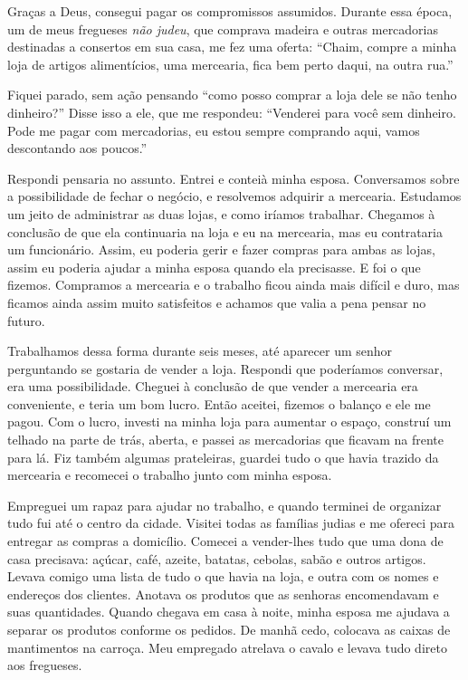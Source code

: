 Graças a Deus, consegui pagar os compromissos assumidos. Durante essa época, um 
de meus fregueses \textit{não judeu}, que comprava madeira e outras
mercadorias destinadas a consertos em sua casa, me fez uma oferta: ``Chaim,
compre a minha loja de artigos alimentícios, uma mercearia, fica bem
perto daqui, na outra rua.''

Fiquei parado, sem ação pensando ``como posso comprar a loja dele se
não tenho dinheiro?'' Disse isso a ele, que me respondeu: ``Venderei
para você sem dinheiro. Pode me pagar com mercadorias, eu estou
sempre comprando aqui, vamos descontando aos poucos.''

Respondi pensaria no assunto. Entrei e conteià minha esposa. Conversamos sobre a possibilidade de
fechar o negócio, e resolvemos adquirir a mercearia. Estudamos um
jeito de administrar as duas lojas, e como iríamos trabalhar. Chegamos à
conclusão de que ela continuaria na loja e eu na mercearia, mas
eu contrataria um funcionário. Assim, eu poderia gerir e fazer compras para ambas as lojas, 
assim eu poderia ajudar a minha esposa quando ela precisasse. E foi o que fizemos. Compramos a mercearia
e o trabalho ficou ainda mais difícil e duro, mas ficamos ainda assim 
muito satisfeitos e achamos que valia a pena pensar no futuro.

Trabalhamos dessa forma durante seis meses, até aparecer um senhor perguntando se 
gostaria de vender a loja. Respondi que poderíamos conversar, era uma possibilidade.
Cheguei à conclusão de que vender a mercearia era conveniente, e teria um bom lucro. 
Então aceitei, fizemos o balanço e ele me pagou. Com o lucro, investi
na minha loja para aumentar o espaço, construí um telhado na parte de trás, aberta, 
e passei as mercadorias que ficavam na frente para lá. Fiz também 
algumas prateleiras, guardei tudo o que havia trazido da mercearia e
recomecei o trabalho junto com minha esposa.

Empreguei um rapaz para ajudar no trabalho, e quando terminei de organizar tudo fui
até o centro da cidade. Visitei todas as famílias judias e me ofereci para entregar as compras a
domicílio. Comecei a vender-lhes tudo que uma dona de casa precisava:
açúcar, café, azeite, batatas, cebolas, sabão e outros artigos. Levava
comigo uma lista de tudo o que havia na loja, e outra com os nomes e endereços
dos clientes. Anotava os produtos que as senhoras encomendavam e suas 
quantidades. Quando chegava em casa à noite, minha
esposa me ajudava a separar os produtos conforme os pedidos. De manhã
cedo, colocava as caixas de mantimentos na carroça. Meu empregado
atrelava o cavalo e levava tudo direto aos fregueses.

